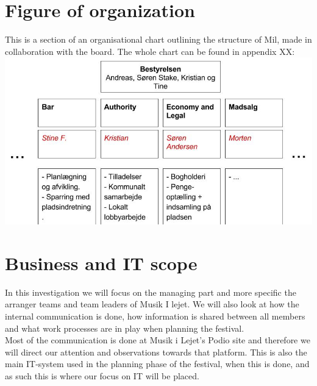 \section{Figure of organization}
\label{sec:organisation}
This is a section of an organisational chart outlining the structure of Mil, made in collaboration with the board. The whole chart can be found in appendix XX: \\
\includegraphics[scale=0.5]{Pictures/MIL_Organisational_chart_Cutout.jpg}
\section{Business and IT scope}
In this investigation we will focus on the managing part and more specific the arranger teams and team leaders of Musik I lejet. We will also look at how the internal communication is done, how information is shared between all members and what work processes are in play when planning the festival. \\
Most of the communication is done at Musik i Lejet's Podio site and therefore we will direct our attention and observations towards that platform. This is also the main IT-system used in the planning phase of the festival, when this is done, and as such this is where our focus on IT will be placed.

